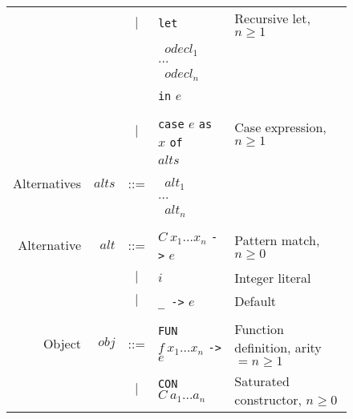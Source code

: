 \documentclass[11pt]{article}
\begin{document}
\begin{figure}
\begin{tabular}{r r c l l}
             &                & $|$ & \texttt{let}                                 & Recursive let, $n\ge 1$ \\
             &                &     & \texttt{ } $\mathit{odecl}_1$ \\
             &                &     & \hspace{0.2in} $\dots$ \\
             &                &     & \texttt{ } $\mathit{odecl}_n$ \\
             &                &     & \texttt{in} $e$  \\
\\
             &                & $|$ & \texttt{case} $e$ \texttt{as} $x$ \texttt{of} & Case expression, $n \ge 1$\\
             &                &     & \hspace{0.2in} $\mathit{alts}$ \\
\\
Alternatives & $\mathit{alts}$ & ::= & \texttt{ } $\mathit{alt}_1$ \\
             &                &     & \hspace{0.2in} $\dots$ \\
             &                &     & \texttt{ } $\mathit{alt}_n$ \\
\\
Alternative  & $\mathit{alt}$ & ::= & $C\ x_1\dots x_n$ \texttt{->} $e$            & Pattern match, $n \ge 0$ \\
             &                & $|$ & $i$                                          & Integer literal \\
             &                & $|$ & \texttt{\_ ->} $e$                           & Default \\
\\
Object       & $\mathit{obj}$ & ::= &\texttt{FUN} $f\ x_1\dots x_n$ \texttt{->} $e$   & Function definition, arity $=n\ge 1$ \\
             &                & $|$ &\texttt{CON} $C\ a_1\dots a_n$                & Saturated constructor, $n \ge 0$ \\

\end{tabular}
\end{figure}
\end{document}
